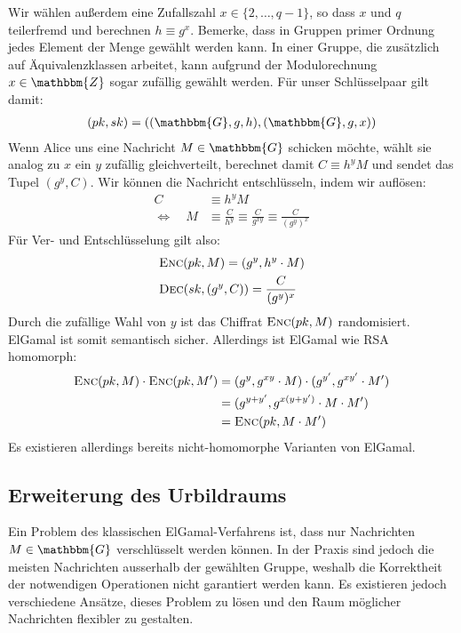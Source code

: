 Wir wählen außerdem eine Zufallszahl $x \in \{2, \dots, q - 1\}$, so dass $x$ und $q$ teilerfremd und berechnen $h \equiv g^x$. Bemerke, dass in Gruppen primer Ordnung jedes Element der Menge gewählt werden kann. In einer Gruppe, die zusätzlich auf Äquivalenzklassen arbeitet, kann aufgrund der Modulorechnung $x \in \mathbbm{Z}$ sogar zufällig gewählt werden. Für unser Schlüsselpaar gilt damit: 
\begin{align*}
  (pk, sk) = ((\mathbbm{G}, g, h), (\mathbbm{G}, g, x))
\end{align*}
Wenn Alice uns eine Nachricht $M \in \mathbbm{G}$ schicken möchte, wählt sie analog zu $x$ ein $y$ zufällig gleichverteilt, berechnet damit $C \equiv h^y M$ und sendet das Tupel $(g^y ,C)$. Wir können die Nachricht entschlüsseln, indem wir auflösen:
\begin{align*}
C &\equiv h^y M \\
\Leftrightarrow \quad M& \equiv \frac{C}{h^y}
 \equiv \frac{C}{g^{xy}}
 \equiv \frac{C}{(g^y)^x}
\end{align*}
Für Ver- und Entschlüsselung gilt also:
\begin{align*}
  &\textsc{Enc}(pk, M) = (g^y, h^y \cdot M) \\
  &\textsc{Dec}(sk, (g^y, C)) = \frac{C}{(g^y)^x}
\end{align*}
Durch die zufällige Wahl von $y$ ist das Chiffrat $\textsc{Enc}({pk, M})$ randomisiert. ElGamal ist somit semantisch sicher. Allerdings ist ElGamal wie RSA homomorph:
\begin{align*}
\textsc{Enc}({pk,M}) \cdot \textsc{Enc}({pk,M'})
&= (g^y, g^{xy} \cdot M) \cdot (g^{y'}, g^{xy'} \cdot M')\\
&= (g^{y+y'}, g^{x(y + y')} \cdot M \cdot M')\\
&= \textsc{Enc}({pk, M \cdot M'})
\end{align*}
Es existieren allerdings bereits nicht-homomorphe Varianten von ElGamal. %

\subsection{Erweiterung des Urbildraums}
Ein Problem des klassischen ElGamal-Verfahrens ist, dass nur Nachrichten $M \in \mathbbm{G}$ verschlüsselt werden können. In der Praxis sind jedoch die meisten Nachrichten ausserhalb der gewählten Gruppe, weshalb die Korrektheit der notwendigen Operationen nicht garantiert werden kann. Es existieren jedoch verschiedene Ansätze, dieses Problem zu lösen und den Raum möglicher Nachrichten flexibler zu gestalten.

